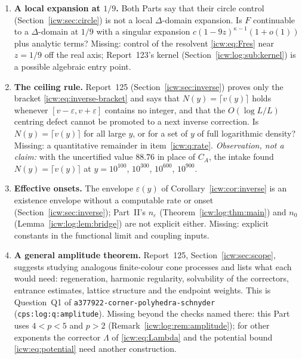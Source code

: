 \documentclass[11pt,letterpaper]{article}
\theoremstyle{remark}\newtheorem{remark}[theorem]{Remark}
\newcommand{\eps}{\varepsilon}
\newcommand{\1}{\mathbf1}
\newcommand{\file}[1]{\textup{\nolinkurl{#1}}}
\begin{document}
\begin{enumerate}[label=\arabic*.,ref=\arabic*]
\item\label{icw:q:delta} \textbf{A local expansion at $1/9$.} Both Parts say that their circle control (Section~\ref{icw:sec:circle}) is not a local $\Delta$-domain expansion. Is $F$ continuable to a $\Delta$-domain at $1/9$ with a singular expansion $c(1-9z)^{\kappa-1}(1+o(1))$ plus analytic terms? Missing: control of the resolvent \eqref{icw:eq:Fres} near $z=1/9$ off the real axis; Report~123's kernel (Section~\ref{icw:log:sub:kernel}) is a possible algebraic entry point.
\item\label{icw:q:ceiling} \textbf{The ceiling rule.} Report~125 (Section~\ref{icw:sec:inverse}) proves only the bracket \eqref{icw:eq:inverse-bracket} and says that $N(y)=\lceil v(y)\rceil$ holds whenever $[v-\eps,v+\eps]$ contains no integer, and that the $O(\log L/L)$ centring defect cannot be promoted to a next inverse correction. Is $N(y)=\lceil v(y)\rceil$ for all large $y$, or for a set of $y$ of full logarithmic density? Missing: a quantitative remainder in item~\ref{icw:q:rate}. \emph{Observation, not a claim:} with the uncertified value $88.76$ in place of $C_A$, the intake found $N(y)=\lceil v(y)\rceil$ at $y=10^{100}$, $10^{300}$, $10^{600}$, $10^{900}$.
\item\label{icw:q:onsets} \textbf{Effective onsets.} The envelope $\eps(y)$ of Corollary~\ref{icw:cor:inverse} is an existence envelope without a computable rate or onset (Section~\ref{icw:sec:inverse}); Part~II's $n_\eps$ (Theorem~\ref{icw:log:thm:main}) and $n_0$ (Lemma~\ref{icw:log:lem:bridge}) are not explicit either. Missing: explicit constants in the functional limit and coupling inputs.
\item\label{icw:q:general} \textbf{A general amplitude theorem.} Report~125, Section~\ref{icw:sec:scope}, suggests studying analogous finite-colour cone processes and lists what each would need: regeneration, harmonic regularity, solvability of the correctors, entrance estimates, lattice structure and the endpoint weights. This is Question~Q1 of \file{a377922-corner-polyhedra-schnyder} (\texttt{cps:log:q:amplitude}). Missing beyond the checks named there: this Part uses $4<p<5$ and $p>2$ (Remark~\ref{icw:log:rem:amplitude}); for other exponents the corrector $\Lambda$ of \eqref{icw:eq:Lambda} and the potential bound \eqref{icw:eq:potential} need another construction.

\end{enumerate}
\end{document}
